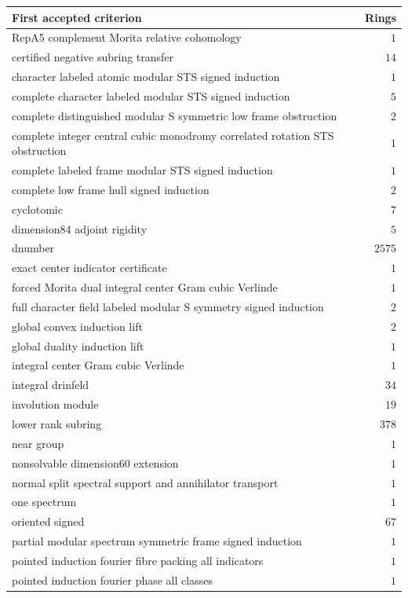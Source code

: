 \begin{center}\small\begin{longtable}{@{}p{}r@{}}\toprule
First accepted criterion & Rings\\\midrule\endhead
RepA5 complement Morita relative cohomology & $1$\\
certified negative subring transfer & $14$\\
character labeled atomic modular STS signed induction & $1$\\
complete character labeled modular STS signed induction & $5$\\
complete distinguished modular S symmetric low frame obstruction & $2$\\
complete integer central cubic monodromy correlated rotation STS obstruction & $1$\\
complete labeled frame modular STS signed induction & $1$\\
complete low frame hull signed induction & $2$\\
cyclotomic & $7$\\
dimension84 adjoint rigidity & $5$\\
dnumber & $2575$\\
exact center indicator certificate & $1$\\
forced Morita dual integral center Gram cubic Verlinde & $1$\\
full character field labeled modular S symmetry signed induction & $2$\\
global convex induction lift & $2$\\
global duality induction lift & $1$\\
integral center Gram cubic Verlinde & $1$\\
integral drinfeld & $34$\\
involution module & $19$\\
lower rank subring & $378$\\
near group & $1$\\
nonsolvable dimension60 extension & $1$\\
normal split spectral support and annihilator transport & $1$\\
one spectrum & $1$\\
oriented signed & $67$\\
partial modular spectrum symmetric frame signed induction & $1$\\
pointed induction fourier fibre packing all indicators & $1$\\
pointed induction fourier phase all classes & $1$\\

\end{longtable}
\end{center}
